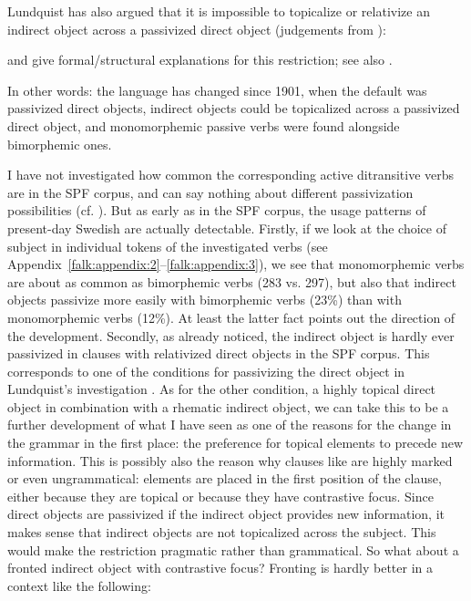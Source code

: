 \documentclass[output=paper]{langscibook}
\begin{document}
Lundquist has also argued that it is impossible to topicalize or relativize an indirect object across a passivized direct object (judgements from \citealt{Lundquist2004}):


\ea%
    \label{ex:falk:27}
\z
\z

\citet{HolmbergEtAl2019} and \citet{Platzack2006} give formal/structural explanations for this restriction; see also \citet{Lundquist2015}. 


In other words: the language has changed since 1901, when the default was passivized direct objects, indirect objects could be topicalized across a passivized direct object, and monomorphemic passive verbs were found alongside bimorphemic ones.



I have not investigated how common the corresponding active ditransitive verbs are in the SPF corpus, and can say nothing about different passivization possibilities (cf. \citealt{HaddicanHolmberg2019}). But as early as in the SPF corpus, the usage patterns of present-day Swedish are actually detectable. Firstly, if we look at the choice of subject in individual tokens of the investigated verbs (see Appendix~\ref{falk:appendix:2}--\ref{falk:appendix:3}), we see that monomorphemic verbs are about as common as bimorphemic verbs (283 vs. 297), but also that indirect objects passivize more easily with bimorphemic verbs (23\%) than with monomorphemic verbs (12\%). At least the latter fact points out the direction of the development. Secondly, as already noticed, the indirect object is hardly ever passivized in clauses with relativized direct objects in the SPF corpus. This corresponds to one of the conditions for passivizing the direct object in Lundquist’s investigation \parencite{Lundquist2004}. As for the other condition, a highly topical direct object in combination with a rhematic indirect object, we can take this to be a further development of what I have seen as one of the reasons for the change in the grammar in the first place: the preference for topical elements to precede new information. This is possibly also the reason why clauses like  are highly marked or even ungrammatical: elements are placed in the first position of the clause, either because they are topical or because they have contrastive focus. Since direct objects are passivized if the indirect object provides new information, it makes sense that indirect objects are not topicalized across the subject. This would make the restriction pragmatic rather than grammatical. So what about a fronted indirect object with contrastive focus? Fronting is hardly better in a context like the following:
\end{document}
